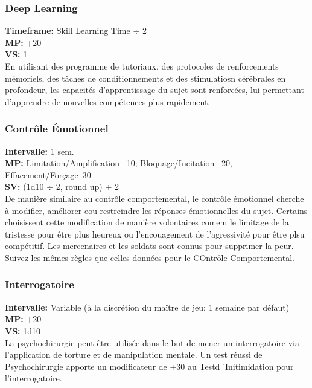\subsubsection{Deep Learning} \textbf{Timeframe:} Skill Learning Time $\div$ 2 \\ \textbf{MP:} +20 \\ \textbf{VS:} 1 \\ En utilisant des programme de tutoriaux, des protocoles de renforcements mémoriels, des tâches de conditionnements et des stimulatiosn cérébrales en profondeur, les capacités d'apprentissage du sujet sont renforcées, lui permettant d'apprendre de nouvelles compétences plus rapidement. 

\subsubsection{Contrôle Émotionnel} \textbf{Intervalle:} 1 sem. \\ \textbf{MP:} Limitation/Amplification –10; Bloquage/Incitation –20, Effacement/Forçage–30 \\ \textbf{SV:} (1d10 $\div$ 2, round up) + 2 \\ De manière similaire au contrôle comportemental, le contrôle émotionnel cherche à modifier, améliorer eou restreindre les réponses émotionnelles du sujet. Certains choisissent cette modification de manière volontaires comem le limitage de la tristesse pour être plus heureux ou l'encouagement de l'agressivité pour être plsu compétitif. Les mercenaires et les soldats sont connus pour supprimer la peur. Suivez les mêmes règles que celles-données pour le COntrôle Comportemental. 



\subsubsection{Interrogatoire} \textbf{Intervalle:} Variable (à la discrétion du maître de jeu; 1 semaine par défaut) \\ \textbf{MP:} +20 \\ \textbf{VS:} 1d10 \\ La psychochirurgie peut-être utilisée dans le but de mener un interrogatoire via l'application de torture et de manipulation mentale. Un test réussi de Psychochirurgie apporte un modificateur de +30 au Testd 'Initimidation pour l'interrogatoire. 

